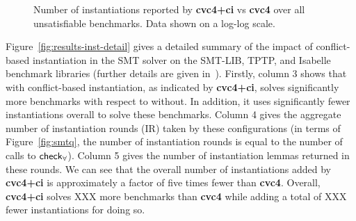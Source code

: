 \documentclass[oribibl]{llncs}
\begin{document}
\begin{figure}[t]
\caption{ Number of instantiations reported by
{\bf cvc4+ci} vs {\bf cvc4} over all unsatisfiable benchmarks.
Data shown on a log-log scale.
}
\label{fig:cbqi-scatter}
\end{figure}

Figure~\ref{fig:results-inst-detail}
gives a detailed summary of the impact of conflict-based instantiation in the SMT solver \cvc
on the SMT-LIB, TPTP, and Isabelle benchmark libraries (further details are given in~\cite{ReynoldsTinelliMoura14}).
Firstly, column 3 shows that \cvc with conflict-based instantiation, as indicated by {\bf cvc4+ci},
solves significantly more benchmarks with respect to \cvc without.
In addition, it uses significantly fewer instantiations overall to solve these benchmarks.
Column 4 gives the aggregate number of instantiation rounds (IR) taken by these configurations
(in terms of Figure~\ref{fig:smtq}, the number of instantiation rounds is equal to the number of calls to $\small\mathsf{check}_\forall$).
Column 5 gives the number of instantiation lemmas returned in these rounds.
We can see that the overall number of instantiations added by {\bf cvc4+ci} is approximately
a factor of five times fewer than {\bf cvc4}.
Overall, {\bf cvc4+ci} solves XXX more benchmarks than {\bf cvc4}
while adding a total of XXX fewer instantiations for doing so.
\end{document}
